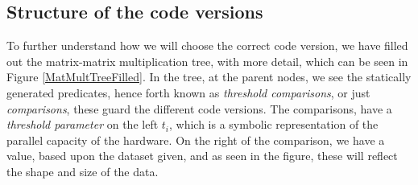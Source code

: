 \subsection{Structure of the code versions}
To further understand how we will choose the correct code version, we have filled out the matrix-matrix multiplication tree, with more detail, which can be seen in Figure \ref{MatMultTreeFilled}. In the tree, at the parent nodes, we see the statically generated predicates, hence forth known as \textit{threshold comparisons}, or just \textit{comparisons}, these guard the different code versions. The comparisons, have a \textit{threshold parameter} on the left $t_i$, which is a symbolic representation of the parallel capacity of the hardware. On the right of the comparison, we have a value, based upon the dataset given, and as seen in the figure, these will reflect the shape and size of the data.
\begin{comment}
The process of autotuning a Futhark program is, to automatically pick the fastest combination (or single) code versions, based on the hardware the program is executed on, and some representative data. In the process of selecting the appropriate code version we have three important terms we, that we be central to this report, and therefore we wish to clearly define them in the context of this report;	
\paragraph{Threshold parameter} or just \textit{threshold} is a value that symbolizes the capacity for parallelism (memory, thread count etc.), of the hardware the program is executed on.
\paragraph{Dataset value} is a value that represent some of the dataset given. For example for the outer \texttt{map} in matrix-matrix multiplication, the dataset value would (primarily) be constructed by the number of rows.
\paragraph{Predicate} threshold comparison, or just comparison, is a comparison between a threshold and a dataset value that guard which code version to use. \\
To pick the best version, we need to tune the threshold parameters, to values that will result en the combination of code versions that gives the fastest runtime. This process is called tuning. The guarding predicates are of the form $threshod \; \leq \; dataset\; value$. By default the threshold parameter is set to a value off $2^{15}$, as an estimate, but is likely sub-optimal. With these terms, we can now fill out the example in Figure \ref{MatMultTree}, getting Figure \ref{MatMultTreeFilled}. 
\end{comment}

